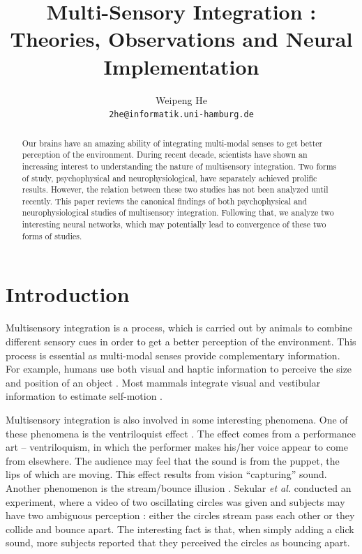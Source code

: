 \documentclass{article}[11pt]
\title{Multi-Sensory Integration : Theories, Observations and Neural Implementation}
\author{Weipeng He \\ \texttt{2he@informatik.uni-hamburg.de}}
\newcommand{\etal}{\textit{et al. }}
\begin{document}
\maketitle

\begin{abstract}
  Our brains have an amazing ability of integrating multi-modal senses to get better perception of the environment. During recent decade, scientists have shown an increasing interest to understanding the nature of multisensory integration. Two forms of study, psychophysical and neurophysiological, have separately achieved prolific results. However, the relation between these two studies has not been analyzed until recently. 
  This paper reviews the canonical findings of both psychophysical and neurophysiological studies of multisensory integration. Following that, we analyze two interesting neural networks, which may potentially lead to convergence of these two forms of studies.
\end{abstract}

\section{Introduction}
\label{sec:intro}

Multisensory integration is a process, which is carried out by animals to combine different sensory cues in order to get a better perception of the environment. This process is essential as multi-modal senses provide complementary information.
For example, humans use both visual and haptic information to perceive the size and position of an object \cite{ernst_humans_2002}. Most mammals integrate visual and vestibular information to estimate self-motion \cite{gu_visual_2006}.

Multisensory integration is also involved in some interesting phenomena. One of these phenomena is the ventriloquist effect \cite{alais_ventriloquist_2004}. The effect comes from a performance art -- ventriloquism, in which the performer makes his/her voice appear to come from elsewhere. The audience may feel that the sound is from the puppet, the lips of which are moving. This effect results from vision ``capturing'' sound.
Another phenomenon is the stream/bounce illusion \cite{sekuler_sound_1997}. Sekular \etal conducted an experiment, where a video of two oscillating circles was given and subjects may have two ambiguous perception : either the circles stream pass each other or they collide and bounce apart. The interesting fact is that, when simply adding a click sound, more subjects reported that they perceived the circles as bouncing apart.
\end{document}
